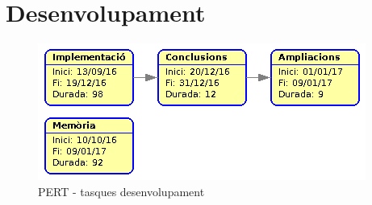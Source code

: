\section{Desenvolupament}
	\begin{figure}[H]
		\centering
		\includegraphics[width=\textwidth]{images/pert-dev}
		\caption{PERT - tasques desenvolupament}
	\end{figure}
\newpage
